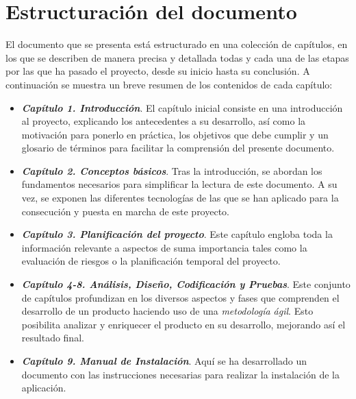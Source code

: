 

\section{Estructuración del documento}
El documento que se presenta está estructurado en una colección de capítulos, 
en los que se describen de manera precisa y detallada todas y cada una de 
las etapas por las que ha pasado el proyecto, desde su inicio hasta su 
conclusión. A continuación se muestra un breve resumen de los contenidos 
de cada capítulo:

\begin{itemize}
    \item \textbf{\emph{Capítulo 1. Introducción}}. El capítulo inicial 
    consiste en una introducción al proyecto, explicando los antecedentes 
    a su desarrollo, así como la motivación para ponerlo en práctica, los 
    objetivos que debe cumplir y un glosario de términos para facilitar 
    la comprensión del presente documento.

    \item \textbf{\emph{Capítulo 2. Conceptos básicos}}. Tras la introducción,
    se abordan los fundamentos necesarios para simplificar la lectura de 
    este documento. A su vez, se exponen las diferentes tecnologías de las 
    que se han aplicado para la consecución y puesta en marcha de este 
    proyecto.

    \item \textbf{\emph{Capítulo 3. Planificación del proyecto}}. Este 
    capítulo engloba toda la información relevante a aspectos de 
    suma importancia tales como la evaluación de riesgos o la planificación 
    temporal del proyecto.

    \item \textbf{\emph{Capítulo 4-\@8. Análisis, Diseño, Codificación y 
    Pruebas}}. Este conjunto de capítulos profundizan en los diversos 
    aspectos y fases que comprenden el desarrollo de un producto haciendo 
    uso de una \emph{metodología ágil}. Esto posibilita analizar y 
    enriquecer el producto en su desarrollo, mejorando así el resultado 
    final.

    \item \textbf{\emph{Capítulo 9. Manual de Instalación}}. Aquí se 
    ha desarrollado un documento con las instrucciones necesarias 
    para realizar la instalación de la aplicación.


\end{itemize}
